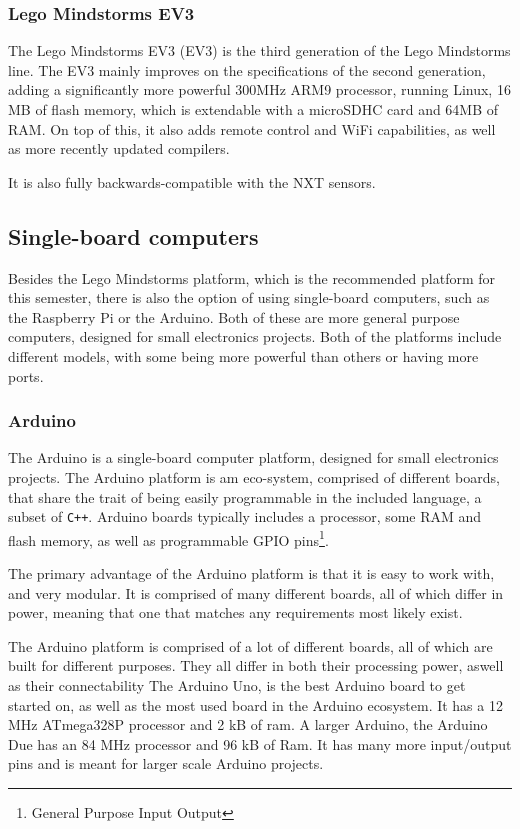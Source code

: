 \subsubsection{Lego Mindstorms EV3}
The  Lego Mindstorms EV3 (EV3) is the third generation of the Lego Mindstorms line.
The EV3 mainly improves on the specifications of the second generation, adding a significantly more powerful 300MHz ARM9 processor, running Linux, 16 MB of flash memory, which is extendable with a microSDHC card and 64MB of RAM\cite{ev3userguide}.
On top of this, it also adds remote control and WiFi capabilities, as well as more recently updated compilers.

It is also fully backwards-compatible with the NXT sensors\cite{ev3nxtcompatability}.

\subsection{Single-board computers}
Besides the Lego Mindstorms platform, which is the recommended platform for this semester, there is also the option of using single-board computers, such as the Raspberry Pi or the Arduino.
Both of these are more general purpose computers, designed for small electronics projects.
Both of the platforms include different models, with some being more powerful than others or having more ports.

\subsubsection{Arduino}
The Arduino is a single-board computer platform, designed for small electronics projects.
The Arduino platform is am eco-system, comprised of different boards, that share the trait of being easily programmable in the included language, a subset of \texttt{C++}.
Arduino boards typically includes a processor, some RAM and flash memory, as well as programmable GPIO pins\footnote{General Purpose Input Output}.

The primary advantage of the Arduino platform is that it is easy to work with, and very modular.
It is comprised of many different boards, all of which differ in power, meaning that one that matches any requirements most likely exist.

The Arduino platform is comprised of a lot of different boards, all of which are built for different purposes.
They all differ in both their processing power, aswell as their connectability
The Arduino Uno, is the best Arduino board to get started on, as well as the most used board in the Arduino ecosystem\cite{ArduinoUno3}.
It has a 12 MHz ATmega328P processor and 2 kB of ram.
A larger Arduino, the Arduino Due has an 84 MHz processor and 96 kB of Ram\cite{ArduinoDue}.
It has many more input/output pins and is meant for larger scale Arduino projects.

